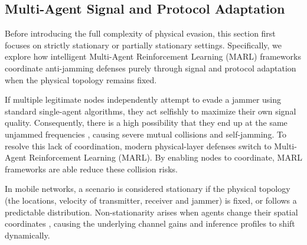 \documentclass[journal]{IEEEtran}
\newcommand{\adm}[1]{{\color{orange}{[#1]}}}
\newcommand{\rar}[1]{{\color{blue}{[#1]}}}
\begin{document}
\subsection{Multi-Agent Signal and Protocol Adaptation}
Before introducing the full complexity of physical evasion, this section first focuses on strictly stationary or partially stationary settings.
Specifically, we explore how intelligent Multi-Agent Reinforcement Learning (MARL) frameworks coordinate anti-jamming defenses purely through signal and protocol adaptation when the physical topology remains fixed.

If multiple legitimate nodes independently attempt to evade a jammer using standard single-agent algorithms, they act selfishly to maximize their own signal quality.
Consequently, there is a high possibility that they end up at the same unjammed frequencies 
, causing severe mutual collisions and self-jamming.
To resolve this lack of coordination, modern physical-layer defenses switch to Multi-Agent Reinforcement Learning (MARL). 
By enabling nodes to coordinate, MARL frameworks are able reduce these collision risks.
 
In mobile networks, a scenario is considered stationary if the physical topology (the locations, velocity of transmitter, receiver and jammer) is fixed, or follows a predictable distribution.
Non-stationarity arises when agents change their spatial coordinates \adm{there are various other forms of non-stationarity beyond just position change. actually, mobile scenarios could also be seen stationary if the parameters that regulate movement (e.g., speed, model) do not change over time}
\rar{maybe decide on other form of non-stationarity? research}
, causing the underlying channel gains and inference profiles to shift dynamically.
\end{document}
